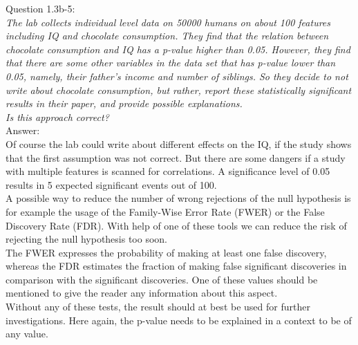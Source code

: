 
Question 1.3b-5:\\	
\textsl{ The lab collects individual level data on 50000 humans on about 100 features including IQ and chocolate consumption. They find that the relation between chocolate consumption and IQ has a p-value higher than 0.05. However, they find that there are some other variables in the data set that has p-value lower than 0.05, namely, their father's income and number of siblings. So they decide to not write about chocolate consumption, but rather, report these statistically significant results in their paper, and provide possible explanations.}\\

\textsl{Is this approach correct? }\\

Answer:\\
Of course the lab could write about different effects on the IQ, if the study shows that the first assumption was not correct. But there are some dangers if a study with multiple features is scanned for correlations. A significance level of 0.05 results in 5 expected significant events out of 100.\\

A possible way to reduce the number of wrong rejections of the null hypothesis is for example the usage of the Family-Wise Error Rate (FWER) or the False Discovery Rate (FDR). With help of one of these tools we can reduce the risk of rejecting the null hypothesis too soon.\\

The FWER expresses the probability of making at least one false discovery, whereas the FDR estimates the fraction of making false significant discoveries in comparison with the significant discoveries. One of these values should be mentioned to give the reader any information about this aspect.\\

Without any of these tests, the result should at best be used for further investigations. Here again, the p-value needs to be explained in a context to be of any value.\\
